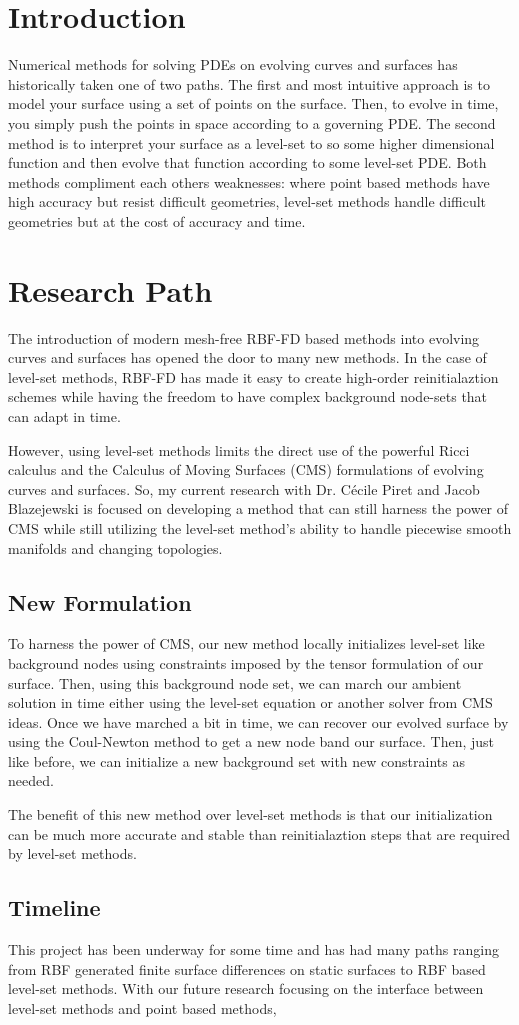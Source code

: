 \documentclass[a4paper,11pt]{article}
\begin{document}
\section*{Introduction}
	Numerical methods for solving PDEs on evolving curves and surfaces has historically taken one of two paths. The first and most intuitive approach is to model your surface using a set of points on the surface. Then, to evolve in time, you simply push the points in space according to a governing PDE. The second method is to interpret your surface as a level-set to so some higher dimensional function and then evolve that function according to some level-set PDE. Both methods compliment each others weaknesses: where point based methods have high accuracy but resist difficult geometries, level-set methods handle difficult geometries but at the cost of accuracy and time. 
	
\section*{Research Path}
	The introduction of modern mesh-free RBF-FD based methods into evolving curves and surfaces has opened the door to many new methods. In the case of level-set methods, RBF-FD has made it easy to create high-order reinitialaztion schemes while having the freedom to have complex background node-sets that can adapt in time.
	
	However, using level-set methods limits the direct use of the powerful Ricci calculus and the Calculus of Moving Surfaces (CMS) formulations of evolving curves and surfaces. So, my current research with Dr. C\'ecile Piret and Jacob Blazejewski is focused on developing a method that can still harness the power of CMS while still utilizing the level-set method's ability to handle piecewise smooth manifolds and changing topologies. 
	
\subsection*{New Formulation}
	To harness the power of CMS, our new method locally initializes level-set like background nodes using constraints imposed by the tensor formulation of our surface. Then, using this background node set, we can march our ambient solution in time either using the level-set equation or another solver from CMS ideas. Once we have marched a bit in time, we can recover our evolved surface by using the Coul-Newton method to get a new node band our surface. Then, just like before, we can initialize a new background set with new constraints as needed.
	
	The benefit of this new method over level-set methods is that our initialization can be much more accurate and stable than reinitialaztion steps that are required by level-set methods.
	
\subsection*{Timeline}
	This project has been underway for some time and has had many paths ranging from RBF generated finite surface differences on static surfaces to RBF based  level-set methods. With our future research focusing on the interface between level-set methods and point based methods, 
\end{document}
